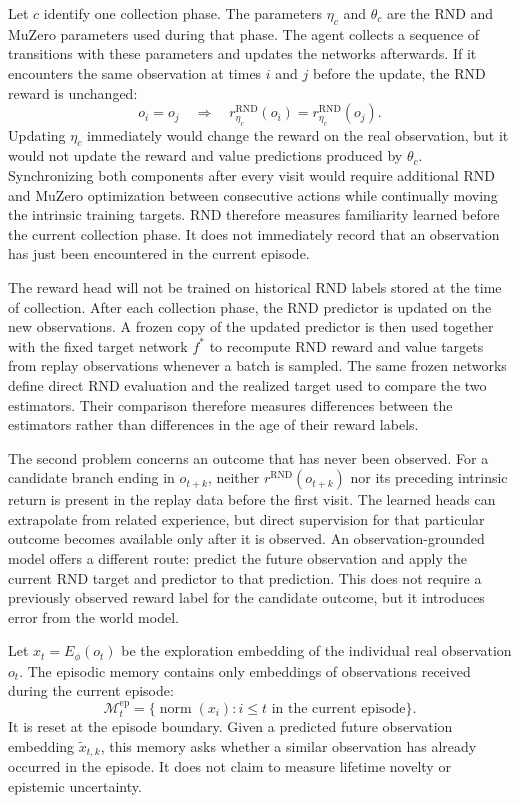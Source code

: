 \documentclass{article}
\begin{document}
Let $c$ identify one collection phase. The parameters $\eta_c$ and $\theta_c$
are the RND and MuZero parameters used during that phase. The agent collects a
sequence of transitions with these parameters and updates the networks
afterwards. If it encounters the same observation at times $i$ and $j$ before
the update, the RND reward is unchanged:
\begin{equation}
    o_i=o_j
    \quad\Longrightarrow\quad
    r^{\mathrm{RND}}_{\eta_c}(o_i)
      =r^{\mathrm{RND}}_{\eta_c}(o_j).
\end{equation}
Updating $\eta_c$ immediately would change the reward on the real observation,
but it would not update the reward and value predictions produced by
$\theta_c$. Synchronizing both components after every visit would require
additional RND and MuZero optimization between consecutive actions while
continually moving the intrinsic training targets. RND therefore measures
familiarity learned before the current collection phase. It does not
immediately record that an observation has just been encountered in the
current episode.

The reward head will not be trained on historical RND labels stored at the time
of collection. After each collection phase, the RND predictor is updated on the
new observations. A frozen copy of the updated predictor is then used together
with the fixed target network $f^\ast$ to recompute RND reward and value targets
from replay observations whenever a batch is sampled. The same frozen networks
define direct RND evaluation and the realized target used to compare the two
estimators. Their comparison therefore measures differences between the
estimators rather than differences in the age of their reward labels.

The second problem concerns an outcome that has never been observed. For a
candidate branch ending in $o_{t+k}$, neither
$r^{\mathrm{RND}}(o_{t+k})$ nor its preceding intrinsic return is present in
the replay data before the first visit. The learned heads can extrapolate from
related experience, but direct supervision for that particular outcome becomes
available only after it is observed. An observation-grounded model offers a
different route: predict the future observation and apply the current RND
target and predictor to that prediction. This does not require a previously
observed reward label for the candidate outcome, but it introduces error from
the world model.

Let $x_t=E_\phi(o_t)$ be the exploration embedding of the individual real
observation $o_t$. The episodic memory contains only embeddings of observations
received during the current episode:
\begin{equation}
    \mathcal{M}^{\mathrm{ep}}_t
        =\{\operatorname{norm}(x_i):
          i\leq t\text{ in the current episode}\}.
\end{equation}
It is reset at the episode boundary. Given a predicted future observation
embedding $\tilde x_{t,k}$, this memory asks whether a similar observation has
already occurred in the episode. It does not claim to measure lifetime novelty
or epistemic uncertainty.
\end{document}
